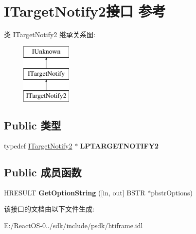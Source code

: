\hypertarget{interface_i_target_notify2}{}\section{I\+Target\+Notify2接口 参考}
\label{interface_i_target_notify2}
类 I\+Target\+Notify2 继承关系图\+:\begin{figure}[H]
\begin{center}
\leavevmode
\includegraphics[height=3.000000cm]{interface_i_target_notify2}
\end{center}
\end{figure}
\subsection*{Public 类型}
\begin{DoxyCompactItemize}
\item 
\mbox{\label{interface_i_target_notify2_a8558c5225d80cb4b84d14f8380bc8fec}} 
typedef \hyperlink{interface_i_target_notify2}{I\+Target\+Notify2} $\ast$ {\bfseries L\+P\+T\+A\+R\+G\+E\+T\+N\+O\+T\+I\+F\+Y2}
\end{DoxyCompactItemize}
\subsection*{Public 成员函数}
\begin{DoxyCompactItemize}
\item 
\mbox{\label{interface_i_target_notify2_a61d9c27d3d8fd677423eb6ffcd21d38c}} 
H\+R\+E\+S\+U\+LT {\bfseries Get\+Option\+String} (\mbox{[}in, out\mbox{]} B\+S\+TR $\ast$pbstr\+Options)
\end{DoxyCompactItemize}


该接口的文档由以下文件生成\+:\begin{DoxyCompactItemize}
\item 
E\+:/\+React\+O\+S-\/0../sdk/include/psdk/htiframe.\+idl\end{DoxyCompactItemize}

